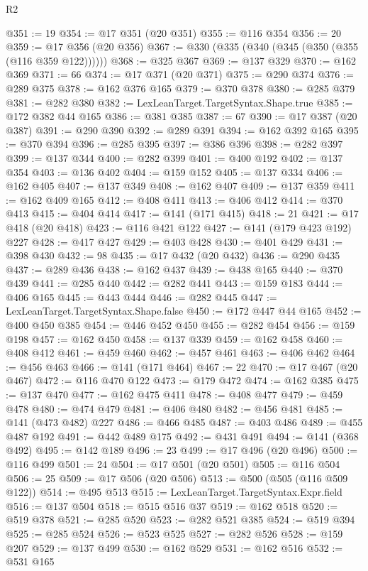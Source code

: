 \begin{lexlean}{R2}
\begin{coremodule}
@351 := 19
@354 := @17 @351 (@20 @351)
@355 := @116 @354
@356 := 20
@359 := @17 @356 (@20 @356)
@367 := @330 (@335 (@340 (@345 (@350 (@355 (@116 @359 @122))))))
@368 := @325 @367
@369 := @137 @329
@370 := @162 @369
@371 := 66
@374 := @17 @371 (@20 @371)
@375 := @290 @374
@376 := @289 @375
@378 := @162 @376 @165
@379 := @370 @378
@380 := @285 @379
@381 := @282 @380
@382 := LexLeanTarget.TargetSyntax.Shape.true
@385 := @172 @382 @44 @165
@386 := @381 @385
@387 := 67
@390 := @17 @387 (@20 @387)
@391 := @290 @390
@392 := @289 @391
@394 := @162 @392 @165
@395 := @370 @394
@396 := @285 @395
@397 := @386 @396
@398 := @282 @397
@399 := @137 @344
@400 := @282 @399
@401 := @400 @192
@402 := @137 @354
@403 := @136 @402
@404 := @159 @152
@405 := @137 @334
@406 := @162 @405
@407 := @137 @349
@408 := @162 @407
@409 := @137 @359
@411 := @162 @409 @165
@412 := @408 @411
@413 := @406 @412
@414 := @370 @413
@415 := @404 @414
@417 := @141 (@171 @415)
@418 := 21
@421 := @17 @418 (@20 @418)
@423 := @116 @421 @122
@427 := @141 (@179 @423 @192) @227
@428 := @417 @427
@429 := @403 @428
@430 := @401 @429
@431 := @398 @430
@432 := 98
@435 := @17 @432 (@20 @432)
@436 := @290 @435
@437 := @289 @436
@438 := @162 @437
@439 := @438 @165
@440 := @370 @439
@441 := @285 @440
@442 := @282 @441
@443 := @159 @183
@444 := @406 @165
@445 := @443 @444
@446 := @282 @445
@447 := LexLeanTarget.TargetSyntax.Shape.false
@450 := @172 @447 @44 @165
@452 := @400 @450 @385
@454 := @446 @452 @450
@455 := @282 @454
@456 := @159 @198
@457 := @162 @450
@458 := @137 @339
@459 := @162 @458
@460 := @408 @412
@461 := @459 @460
@462 := @457 @461
@463 := @406 @462
@464 := @456 @463
@466 := @141 (@171 @464)
@467 := 22
@470 := @17 @467 (@20 @467)
@472 := @116 @470 @122
@473 := @179 @472
@474 := @162 @385
@475 := @137 @470
@477 := @162 @475 @411
@478 := @408 @477
@479 := @459 @478
@480 := @474 @479
@481 := @406 @480
@482 := @456 @481
@485 := @141 (@473 @482) @227
@486 := @466 @485
@487 := @403 @486
@489 := @455 @487 @192
@491 := @442 @489 @175
@492 := @431 @491
@494 := @141 (@368 @492)
@495 := @142 @189
@496 := 23
@499 := @17 @496 (@20 @496)
@500 := @116 @499
@501 := 24
@504 := @17 @501 (@20 @501)
@505 := @116 @504
@506 := 25
@509 := @17 @506 (@20 @506)
@513 := @500 (@505 (@116 @509 @122))
@514 := @495 @513
@515 := LexLeanTarget.TargetSyntax.Expr.field
@516 := @137 @504
@518 := @515 @516 @37
@519 := @162 @518
@520 := @519 @378
@521 := @285 @520
@523 := @282 @521 @385
@524 := @519 @394
@525 := @285 @524
@526 := @523 @525
@527 := @282 @526
@528 := @159 @207
@529 := @137 @499
@530 := @162 @529
@531 := @162 @516
@532 := @531 @165

\end{coremodule}
\end{lexlean}
